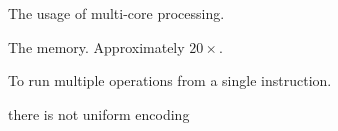 \documentclass[abstract=true]{scrartcl}
\begin{document}
\begin{question}
    The usage of multi-core processing.
\end{question}

\begin{question}
    The memory. Approximately $20\times$.
\end{question}

\begin{question}
    To run multiple operations from a single instruction. 
\end{question}

there is not uniform encoding





\end{document}
